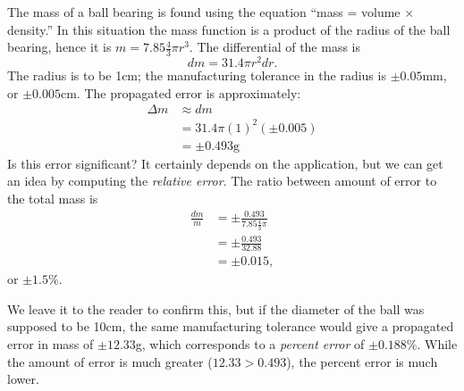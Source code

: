 {The mass of a ball bearing is found using the equation ``mass = volume $\times$ density.'' In this situation the mass function is a product of the radius of the ball bearing, hence it is $m = 7.85\frac43\pi r^3$. The differential of the mass is $$dm = 31.4\pi r^2 dr.$$ The radius is to be 1cm; the manufacturing tolerance in the radius is $\pm 0.05$mm, or $\pm 0.005$cm. The propagated error is approximately:
\begin{align*}
\Delta m & \approx dm \\
				&= 31.4\pi (1)^2 (\pm 0.005) \\
				&= \pm 0.493\text{g}
\end{align*}
Is this error significant? It certainly depends on the application, but we can get an idea by computing the \textit{relative error}. The ratio between amount of error to the total mass is
\begin{align*}
\frac{dm}{m} &= \pm \frac{0.493}{7.85\frac43\pi} \\
							&=\pm \frac{0.493}{32.88}\\
							&=\pm 0.015,
\end{align*}
or $\pm 1.5$\%. 


We leave it to the reader to confirm this, but if the diameter of the ball was supposed to be 10cm, the same manufacturing tolerance would give a propagated error in mass of $\pm12.33$g, which corresponds to a \textit{percent error} of $\pm0.188$\%. While the amount of error is much greater ($12.33 > 0.493$), the percent error is much lower.
}\\


